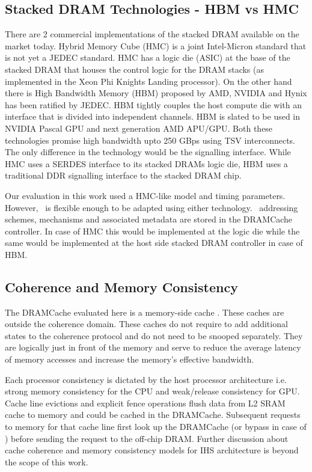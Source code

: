 \subsection{Stacked DRAM Technologies - HBM vs HMC}
There are 2 commercial implementations of the stacked DRAM available on the market today. 
Hybrid Memory Cube (HMC) is a joint Intel-Micron standard that is not yet a JEDEC standard. 
HMC has a logic die (ASIC) at the base of the stacked DRAM that houses the control logic for the DRAM stacks (as implemented in the Xeon Phi Knights Landing processor\cite{xeonphi}). 
On the other hand there is High Bandwidth Memory (HBM) proposed by AMD, NVIDIA and Hynix has been ratified by JEDEC. 
HBM tightly couples the host compute die with an interface that is divided into independent channels.
HBM is slated to be used in NVIDIA Pascal GPU and next generation AMD APU/GPU.
Both these technologies promise high bandwidth upto 250 GBps using TSV interconnects. The only difference in the technology would be the signalling interface. While HMC uses a SERDES interface to its stacked DRAMs logic die, HBM uses a traditional DDR signalling interface to the stacked DRAM chip.
\par Our evaluation in this work used a HMC-like model and timing parameters. However, \cachename\ is flexible enough to be adapted using either technology. \cachename\ addressing schemes, mechanisms and associated metadata are stored in the DRAMCache controller. In case of HMC this would be implemented at the logic die while the same would be implemented at the host side stacked DRAM controller in case of HBM.

\subsection{Coherence and Memory Consistency} \label{discussion:coherence}
The DRAMCache evaluated here is a memory-side cache \cite{primer-coherence-consistency, mainak-hpca, skylake}.  These caches are outside the coherence domain. These caches do not require to add additional states to the coherence protocol and do not need to be snooped separately. They are logically just in front of the memory and serve to reduce the average latency of memory accesses and increase the memory's effective bandwidth.  
\par Each processor consistency is dictated by the host processor architecture i.e. strong memory consistency for the CPU and weak/release consistency for GPU. Cache line evictions and explicit fence operations flush data from L2 SRAM cache to memory and could be cached in the DRAMCache. Subsequent requests to memory for that cache line first look up the DRAMCache (or bypass in case of \bypassname) before sending the request to the off-chip DRAM. Further discussion about cache coherence and memory consistency models for IHS architecture is beyond the scope of this work.

